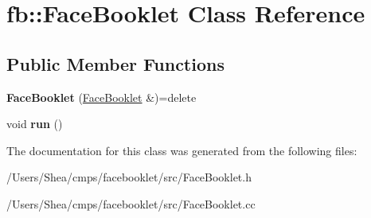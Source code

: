 \hypertarget{classfb_1_1_face_booklet}{\section{fb\+:\+:Face\+Booklet Class Reference}
\label{classfb_1_1_face_booklet}
}
\subsection*{Public Member Functions}
\begin{DoxyCompactItemize}
\item 
\hypertarget{classfb_1_1_face_booklet_a9423083c143d839392c89a0e5753bf61}{{\bfseries Face\+Booklet} (\hyperlink{classfb_1_1_face_booklet}{Face\+Booklet} \&)=delete}\label{classfb_1_1_face_booklet_a9423083c143d839392c89a0e5753bf61}

\item 
\hypertarget{classfb_1_1_face_booklet_a59e4c9ecf6767a14f9b79d4f6cfa2c6d}{void {\bfseries run} ()}\label{classfb_1_1_face_booklet_a59e4c9ecf6767a14f9b79d4f6cfa2c6d}

\end{DoxyCompactItemize}


The documentation for this class was generated from the following files\+:\begin{DoxyCompactItemize}
\item 
/\+Users/\+Shea/cmps/facebooklet/src/Face\+Booklet.\+h\item 
/\+Users/\+Shea/cmps/facebooklet/src/Face\+Booklet.\+cc\end{DoxyCompactItemize}
